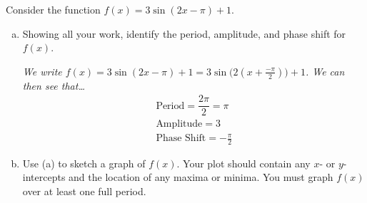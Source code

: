 \documentclass[12pt,letterpaper]{exam}
\begin{document}
\begin{questions}
\newpage
{} \par\vspace{0.3cm}

Consider the function $f(x)= 3\sin(2x - \pi) + 1$.
	\begin{enumerate}[(a)]
	\item Showing all your work, identify the period, amplitude, and phase shift for $f(x)$. \pspace
	
	{\itshape We write $f(x)= 3 \sin(2x - \pi) + 1= 3 \sin \!\big(2 (x + \frac{-\pi}{2}) \big) + 1$. We can then see that\dots
		\[
		\boxed{
		\begin{gathered}
		\text{Period}= \dfrac{2\pi}{2}= \pi \\[0.3cm]
		\text{Amplitude}= 3 \\[0.3cm]
		\text{Phase Shift}= -\frac{\pi}{2}
		\end{gathered}
		}
		\]
	} \pvspace{1.5cm}
	
	\item Use (a) to sketch a graph of $f(x)$. Your plot should contain any $x$- or $y$-intercepts and the location of any maxima or minima. You must graph $f(x)$ over at least one full period. \pspace
	

\end{enumerate}
\end{questions}
\end{document}
